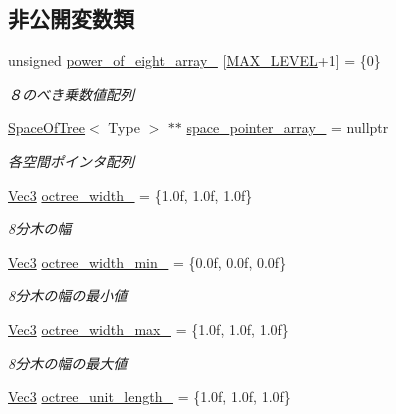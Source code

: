 \subsection*{非公開変数類}
\begin{DoxyCompactItemize}
\item 
unsigned \mbox{\hyperlink{class_liner_octree_ab7ddbc8f86cfa3ff46f01f080b56572a}{power\+\_\+of\+\_\+eight\+\_\+array\+\_\+}} \mbox{[}\mbox{\hyperlink{class_liner_octree_aced865f2822181486eb805e4db1f0a32}{M\+A\+X\+\_\+\+L\+E\+V\+EL}}+1\mbox{]} = \{0\}
\begin{DoxyCompactList}\small\item\em ８のべき乗数値配列 \end{DoxyCompactList}\item 
\mbox{\hyperlink{class_space_of_tree}{Space\+Of\+Tree}}$<$ Type $>$ $\ast$$\ast$ \mbox{\hyperlink{class_liner_octree_a0ffc2effd42779c7f88c4eecc8a68bfb}{space\+\_\+pointer\+\_\+array\+\_\+}} = nullptr
\begin{DoxyCompactList}\small\item\em 各空間ポインタ配列 \end{DoxyCompactList}\item 
\mbox{\hyperlink{_vector3_d_8h_ab16f59e4393f29a01ec8b9bbbabbe65d}{Vec3}} \mbox{\hyperlink{class_liner_octree_accf45495e9a4cbf5ed3d8a839eda9806}{octree\+\_\+width\+\_\+}} = \{1.\+0f, 1.\+0f, 1.\+0f\}
\begin{DoxyCompactList}\small\item\em 8分木の幅 \end{DoxyCompactList}\item 
\mbox{\hyperlink{_vector3_d_8h_ab16f59e4393f29a01ec8b9bbbabbe65d}{Vec3}} \mbox{\hyperlink{class_liner_octree_a391dbd4c22c6b16bfe49884d8b156738}{octree\+\_\+width\+\_\+min\+\_\+}} = \{0.\+0f, 0.\+0f, 0.\+0f\}
\begin{DoxyCompactList}\small\item\em 8分木の幅の最小値 \end{DoxyCompactList}\item 
\mbox{\hyperlink{_vector3_d_8h_ab16f59e4393f29a01ec8b9bbbabbe65d}{Vec3}} \mbox{\hyperlink{class_liner_octree_abf54d24034d8ae53d7f7d17e6dfe02ff}{octree\+\_\+width\+\_\+max\+\_\+}} = \{1.\+0f, 1.\+0f, 1.\+0f\}
\begin{DoxyCompactList}\small\item\em 8分木の幅の最大値 \end{DoxyCompactList}\item 
\mbox{\hyperlink{_vector3_d_8h_ab16f59e4393f29a01ec8b9bbbabbe65d}{Vec3}} \mbox{\hyperlink{class_liner_octree_af412add67f71dd8ceb8af82be6015988}{octree\+\_\+unit\+\_\+length\+\_\+}} = \{1.\+0f, 1.\+0f, 1.\+0f\}
$$
\end{DoxyCompactItemize}
